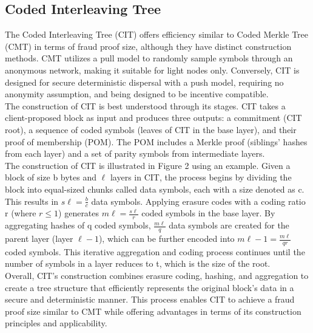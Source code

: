 \subsection{Coded Interleaving Tree}
The Coded Interleaving Tree (CIT) offers efficiency similar to Coded Merkle Tree (CMT) in terms of fraud proof size, although they have distinct construction methods. CMT utilizes a pull model to randomly sample symbols through an anonymous network, making it suitable for light nodes only. Conversely, CIT is designed for secure deterministic dispersal with a push model, requiring no anonymity assumption, and being designed to be incentive compatible.\\
The construction of CIT is best understood through its stages. CIT takes a client-proposed block as input and produces three outputs: a commitment (CIT root), a sequence of coded symbols (leaves of CIT in the base layer), and their proof of membership (POM). The POM includes a Merkle proof (siblings' hashes from each layer) and a set of parity symbols from intermediate layers.\\
The construction of CIT is illustrated in Figure 2 using an example. Given a block of size b bytes and $\ell$ layers in CIT, the process begins by dividing the block into equal-sized chunks called data symbols, each with a size denoted as c. This results in $s\ell = \frac{b}{c}$ data symbols. Applying erasure codes with a coding ratio r (where $r ≤ 1$) generates $m\ell = \frac{s\ell}{r}$ coded symbols in the base layer. By aggregating hashes of q coded symbols, $\frac{m\ell}{q}$ data symbols are created for the parent layer (layer $\ell - 1$), which can be further encoded into $m\ell - 1 = \frac{m\ell}{qr}$ coded symbols. This iterative aggregation and coding process continues until the number of symbols in a layer reduces to t, which is the size of the root.\\
Overall, CIT's construction combines erasure coding, hashing, and aggregation to create a tree structure that efficiently represents the original block's data in a secure and deterministic manner. This process enables CIT to achieve a fraud proof size similar to CMT while offering advantages in terms of its construction principles and applicability.
